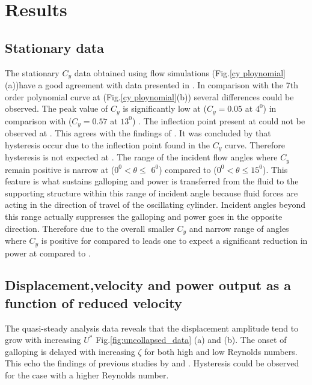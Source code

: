 \section{Results}

\subsection{Stationary data}

The stationary $C_y$ data obtained using flow simulations (Fig.\ref{cy ploynomial}(a))have a good agreement with data presented in \cite{Joly2012}. In comparison with the 7th order polynomial curve at  (Fig.\ref{cy ploynomial}(b))  several differences could be observed. The peak value of $C_y$ is  significantly low at  ($C_y=0.05$ at $4^0$) in comparison with  ($C_y=0.57$ at $13^0$) . The inflection point present at  could not be observed at . This agrees with the findings of \cite{Luo2003}. It was concluded by \cite{Luo2003} that hysteresis occur due to the inflection point found in the $C_y$ curve. Therefore hysteresis is not expected at . The range of the incident flow angles where $C_y$ remain positive is narrow at  ($0^0 <\theta \leq$ $6^0$) compared to  ($0^0 <\theta \leq 15^0$). This feature is what sustains galloping and power is transferred from the fluid to the supporting structure within this range of incident angle because fluid forces are acting in the direction of travel of the oscillating cylinder. Incident angles beyond this range actually suppresses the galloping and power goes in the opposite direction. Therefore due to the overall smaller $C_y$ and narrow range of angles where $C_y$ is positive for  compared to  leads one to expect a significant reduction in power at compared to .

  



\subsection{Displacement,velocity and power output as a function of reduced velocity}


 The quasi-steady analysis data reveals that the displacement amplitude tend to grow with increasing $U^*$ Fig.\ref{fig:uncollapsed_data} (a) and (b). The onset of galloping is delayed with increasing $\zeta$ for both high and low Reynolds numbers. This echo the findings of previous studies by \cite{Parkinson1964} and \cite{Barrero-Gil2010a}. Hysteresis could be observed for the case with a higher Reynolds number.

